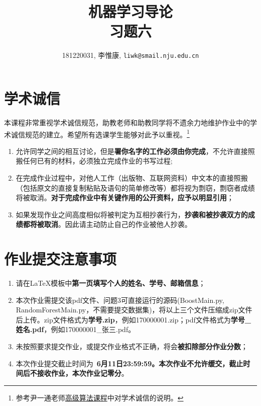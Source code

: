 \documentclass[a4paper,UTF8]{article}
\theoremstyle{definition}
\begin{document}
	\title{机器学习导论\\
		习题六}
	\author{181220031, 李惟康, \texttt{liwk@smail.nju.edu.cn}}
	\maketitle
	
	
	\section*{学术诚信}
	本课程非常重视学术诚信规范，助教老师和助教同学将不遗余力地维护作业中的学术诚信规范的建立。希望所有选课学生能够对此予以重视。\footnote{参考尹一通老师\href{http://tcs.nju.edu.cn/wiki/}{高级算法课程}中对学术诚信的说明。}
	
	\begin{tcolorbox}
		\begin{enumerate}
			\item[(1)] 允许同学之间的相互讨论，但是{\color{red}\textbf{署你名字的工作必须由你完成}}，不允许直接照搬任何已有的材料，必须独立完成作业的书写过程;
			\item[(2)] 在完成作业过程中，对他人工作（出版物、互联网资料）中文本的直接照搬（包括原文的直接复制粘贴及语句的简单修改等）都将视为剽窃，剽窃者成绩将被取消。{\color{red}\textbf{对于完成作业中有关键作用的公开资料，应予以明显引用}}；
			\item[(3)] 如果发现作业之间高度相似将被判定为互相抄袭行为，{\color{red}\textbf{抄袭和被抄袭双方的成绩都将被取消}}。因此请主动防止自己的作业被他人抄袭。
		\end{enumerate}
	\end{tcolorbox}
	
	\section*{作业提交注意事项}
	
	\begin{tcolorbox}
		\begin{enumerate}
			\item[(1)] 请在\LaTeX 模板中{\color{red}\textbf{第一页填写个人的姓名、学号、邮箱信息}}；
			\item[(2)] 本次作业需提交该pdf文件、问题3可直接运行的源码(BoostMain.py, RandomForestMain.py，不需要提交数据集)，将以上三个文件压缩成zip文件后上传。zip文件格式为{\color{red}\textbf{学号.zip}}，例如170000001.zip；pdf文件格式为{\color{red}\textbf{学号\_姓名.pdf}}，例如170000001\_张三.pdf。
			\item[(3)] 未按照要求提交作业，或提交作业格式不正确，将会{\color{red}\textbf{被扣除部分作业分数}}；
			\item[(4)] 本次作业提交截止时间为\ {\color{red}\textbf{6月11日23:59:59。本次作业不允许缓交，截止时间后不接收作业，本次作业记零分}}。
		\end{enumerate}
	\end{tcolorbox}
	
\end{document}
